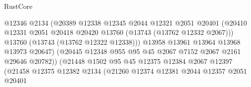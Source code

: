 \begin{lexlean}{RustCore}
\begin{coremodule}
                                        @12346
                                        @2134
                                        (@20389
                                          @12338
                                          @12345
                                          @2044
                                          @12321
                                          @2051
                                          @20401
                                          (@20410
                                            @12331
                                            @2051
                                            @20418
                                            @20420
                                            @13760
                                            (@13743 (@13762 @12332 @2067)))
                                          @13760
                                          (@13743 (@13762 @12322 @12338)))
                                        @13958
                                        @13961
                                        @13964
                                        @13968
                                        @13973
                                        @20647)
                                      (@20445
                                        @12348
                                        @955
                                        @95
                                        @45
                                        @2067
                                        @7152
                                        @2067
                                        @2161
                                        @29646
                                        @20782))
                                    (@21448
                                      @1502
                                      @95
                                      @45
                                      @12375
                                      @12384
                                      @2067
                                      @12397
                                      (@21458
                                        @12375
                                        @12382
                                        @2134
                                        (@21260
                                          @12374
                                          @12381
                                          @2044
                                          @12357
                                          @2051
                                          @20401

\end{coremodule}
\end{lexlean}
